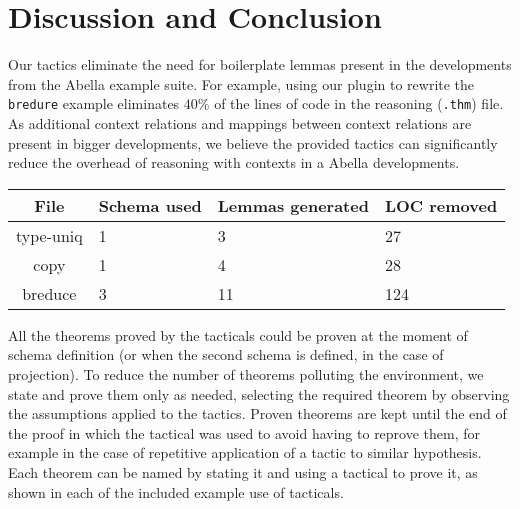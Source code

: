 \documentclass[nocopyrightspace,authoryear]{sigplanconf}
\begin{document}
\begin{comment}
1:
The $i$th context relations \lstinline|S| can be used as the $j$th projection of a context relations \lstinline|S'| if, for each clauses \lstinline|C| of \lstinline|S|, there exists a clause \lstinline|C'| of \lstinline|S'| s.t. the $i$th formula of \lstinline|C| matches the $j$th formula of \lstinline|C'|, which is to say that the $j$th projection of the schema \lstinline|S'| is more general than the $i$th projection schema \lstinline|S| .
\end{comment}


\section{Discussion and Conclusion}
Our tactics eliminate the need for boilerplate lemmas present in the developments from the Abella example suite. For example, using our plugin to rewrite the \lstinline{bredure} example eliminates $40\%$ of the lines of code in the reasoning (\lstinline{.thm}) file. As additional context relations and mappings between context relations are present in bigger developments, we believe the provided tactics can significantly reduce the overhead of reasoning with contexts in a Abella developments.


\begin{center}
\begin{tabular} { | c || p{1.5cm} | p{1.5cm} | p{1.5cm} |}
\hline
File & Schema used & Lemmas generated & LOC removed \\ \hline
type-uniq & 1 & 3 & 27  \\ \hline
copy & 1 & 4 & 28 \\ \hline
breduce & 3 & 11 & 124 \\ \hline

\end{tabular}
\end{center}

All the theorems proved by the tacticals could be proven at the moment of schema definition (or when the second schema is defined, in the case of projection). To reduce the number of theorems polluting the environment, we state and prove them only as needed, selecting the required theorem by observing the assumptions applied to the tactics. Proven theorems are kept until the end of the proof in which the tactical was used to avoid having to reprove them, for example in the case of repetitive application of a tactic to similar hypothesis. Each theorem can be named by stating it and using a tactical to prove it, as shown in each of the included example use of tacticals.
\end{document}
